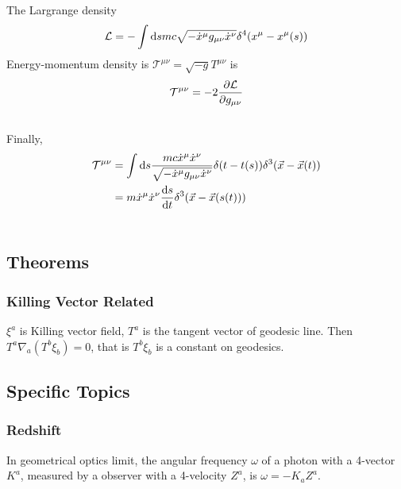 \documentclass[letterpaper,10pt,english]{sphinxmanual}
\begin{document}
The Largrange density
\begin{gather}
\begin{split}\mathcal L = -\int\mathrm ds mc \sqrt{-\dot x^\mu g_{\mu\nu}\dot x^\nu}\delta^4(x^\mu - x^\mu(s))\end{split}\notag
\end{gather}
Energy-momentum density is $\mathcal T^{\mu\nu} = \sqrt{-g}T^{\mu\nu}$ is
\begin{gather}
\begin{split}\mathcal T^{\mu\nu} = -2 \frac{\partial \mathcal L}{\partial g_{\mu\nu}}\end{split}\notag\\\begin{split}\end{split}\notag
\end{gather}
Finally,
\begin{gather}
\begin{split}\mathcal T^{\mu\nu} &= \int \mathrm ds \frac{mc\dot x^\mu \dot x^\nu}{\sqrt{-\dot x^\mu g_{\mu\nu} \dot x^\nu}} \delta(t-t(s))\delta^3(\vec x - \vec x(t)) \\
&= m\dot x^\mu \dot x^\nu \frac{\mathrm d s}{\mathrm d t} \delta^3(\vec x - \vec x(s(t)))\end{split}\notag\\\begin{split}\end{split}\notag
\end{gather}

\subsection{Theorems}
\label{relativity/GeneralRelativity:theorems}

\subsubsection{Killing Vector Related}
\label{relativity/GeneralRelativity:killing-vector-related}
$\xi^a$ is Killing vector field, $T^a$ is the tangent vector of geodesic line. Then $T^a\nabla_a(T^b\xi_b)=0$, that is $T^b\xi_b$ is a constant on geodesics.


\subsection{Specific Topics}
\label{relativity/GeneralRelativity:specific-topics}

\subsubsection{Redshift}
\label{relativity/GeneralRelativity:redshift}
In geometrical optics limit, the angular frequency $\omega$ of a photon with a 4-vector $K^a$, measured by a observer with a 4-velocity $Z^a$, is $\omega=-K_aZ^a$.
\end{document}
